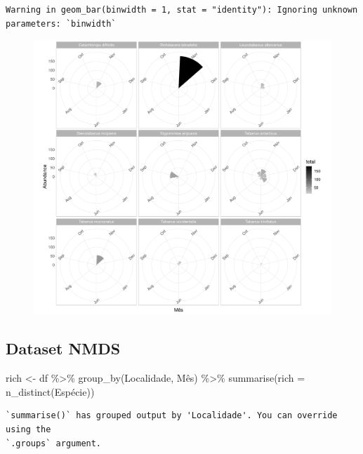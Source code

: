 \documentclass[
  letterpaper,
  DIV=11,
  numbers=noendperiod]{scrartcl}
\newenvironment{Shaded}{\begin{snugshade}}{\end{snugshade}}
\newcommand{\AttributeTok}[1]{\textcolor[rgb]{0.40,0.45,0.13}{#1}}
\newcommand{\FunctionTok}[1]{\textcolor[rgb]{0.28,0.35,0.67}{#1}}
\newcommand{\NormalTok}[1]{\textcolor[rgb]{0.00,0.23,0.31}{#1}}
\newcommand{\OtherTok}[1]{\textcolor[rgb]{0.00,0.23,0.31}{#1}}
\newcommand{\SpecialCharTok}[1]{\textcolor[rgb]{0.37,0.37,0.37}{#1}}
\begin{document}
\begin{verbatim}
Warning in geom_bar(binwidth = 1, stat = "identity"): Ignoring unknown
parameters: `binwidth`
\end{verbatim}

\begin{figure}[H]

{\centering \includegraphics{report_nmds_files/figure-pdf/unnamed-chunk-3-1.pdf}

}

\end{figure}

\hypertarget{dataset-nmds}{%
\subsection{Dataset NMDS}\label{dataset-nmds}}

\begin{Shaded}
\begin{Highlighting}[]
\NormalTok{rich }\OtherTok{\textless{}{-}}
\NormalTok{  df  }\SpecialCharTok{\%\textgreater{}\%}
  \FunctionTok{group\_by}\NormalTok{(Localidade, Mês) }\SpecialCharTok{\%\textgreater{}\%}
  \FunctionTok{summarise}\NormalTok{(}\AttributeTok{rich =} \FunctionTok{n\_distinct}\NormalTok{(Espécie))}
\end{Highlighting}
\end{Shaded}

\begin{verbatim}
`summarise()` has grouped output by 'Localidade'. You can override using the
`.groups` argument.
\end{verbatim}
\end{document}
